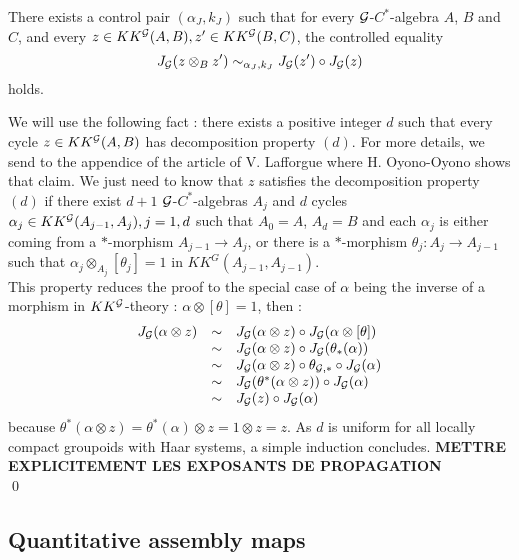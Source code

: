 \begin{prop} There exists a control pair $(\alpha_J,k_J)$ such that for every $\mathcal G$-$C^*$-algebra $A$, $B$ and $C$, and every $z\in KK^\mathcal G(A,B),z'\in KK^\mathcal G(B,C)$, the controlled equality
\[J_\mathcal G(z\otimes_B z') \sim_{\alpha_J,k_J} J_\mathcal G(z')\circ J_\mathcal G(z)\]
holds.
\end{prop}
\begin{dem}
We will use the following fact : there exists a positive integer $d$ such that every cycle $z\in KK^\mathcal G(A,B)$ has decomposition property $(d)$. For more details, we send to the appendice of the article of V. Lafforgue \cite{LaffOY} where H. Oyono-Oyono shows that claim. We just need to know that $z$ satisfies the decomposition property $(d)$ if there exist $d+1$ $\mathcal G$-$C^*$-algebras $A_j$  and $d$ cycles $\alpha_j\in KK^\mathcal G(A_{j-1},A_j), j=1,d$ such that $A_0=A$, $A_d=B$ and each $\alpha_j$ is either coming from a $*$-morphism $A_{j-1}\rightarrow A_j$, or there is a $*$-morphism $\theta_j: A_j\rightarrow A_{j-1}$ such that $\alpha_j \otimes_{A_j} [\theta_j]=1$ in $KK^G(A_{j-1},A_{j-1})$.\\

This property reduces the proof to the special case of $\alpha$ being the inverse of a morphism in $KK^\mathcal G$-theory : $\alpha\otimes[\theta]=1$, then :
\[\begin{array}{rcl}
J_\mathcal G (\alpha\otimes z) & \sim &  J_\mathcal G(\alpha\otimes z)\circ J_\mathcal G(\alpha\otimes [\theta]) \\
			& \sim & J_\mathcal G(\alpha\otimes z)\circ J_\mathcal G(\theta_*(\alpha))\\
			& \sim & J_\mathcal G(\alpha\otimes z)\circ \theta_{\mathcal G,*}\circ J_\mathcal G(\alpha)\\
			& \sim & J_\mathcal G(\theta^*(\alpha\otimes z))\circ J_\mathcal G(\alpha)\\
			& \sim & J_\mathcal G(z)\circ J_\mathcal G(\alpha) \\
\end{array}\] 
because $\theta^*(\alpha\otimes z)=\theta^*(\alpha)\otimes z=1\otimes z =z$. As $d$ is uniform for all locally compact groupoids with Haar systems, a simple induction concludes. \textbf{METTRE EXPLICITEMENT LES EXPOSANTS DE PROPAGATION}\\
\qed
\end{dem}
\subsection{Quantitative assembly maps}

